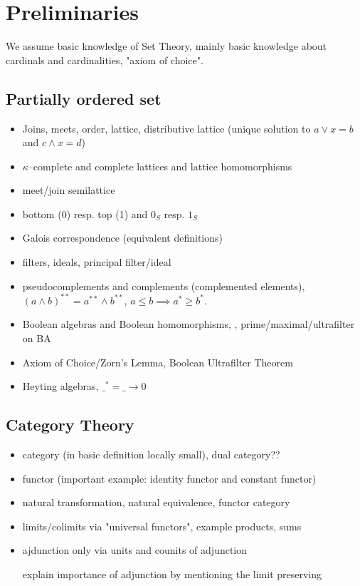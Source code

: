 \chapter{Preliminaries}
    We assume basic knowledge of Set Theory, mainly basic knowledge about cardinals and cardinalities, "axiom of choice".

\section{Partially ordered set}
\begin{itemize}
    \item Joins, meets, order, lattice, distributive lattice (unique solution to $a\vee x = b$ and $c\wedge x = d$)
    \item $\kappa$--complete and complete lattices and lattice homomorphisms %
    \item meet/join semilattice
    \item bottom (0) resp. top (1) and $0_S$ resp. $1_S$
    \item Galois correspondence (equivalent definitions)
    \item filters, ideals, principal filter/ideal
    \item pseudocomplements and complements (complemented elements), $(a \wedge b)^{**} = a^{**} \wedge b^{**}$, $a \leq b \implies a^* \geq b^*$.
    \item Boolean algebras and Boolean homomorphisms, \Bool, prime/maximal/ultrafilter on BA
    \item Axiom of Choice/Zorn's Lemma, Boolean Ultrafilter Theorem
    \item Heyting algebras, $\_^* = \_ \to 0$
\end{itemize}
\section{Category Theory}
\begin{itemize}
    \item category (in basic definition locally small), dual category??
    \item functor (important example: identity functor and constant functor)
    \item natural transformation, natural equivalence, functor category
    \item limits/colimits via "universal functors", example products, sums
    \item ajdunction only via units and counits of adjunction

    explain importance of adjunction by mentioning the limit preserving
\end{itemize}

